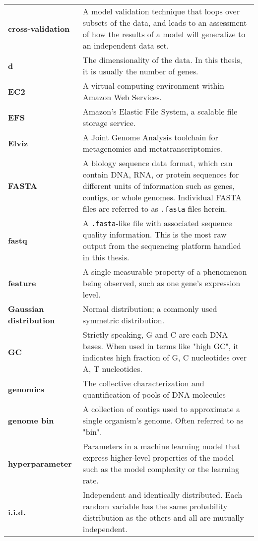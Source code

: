 \begin{singlespace}
\begin{longtable}{ p{}  p{} }
\textbf{cross-validation} &  A model validation technique that loops over subsets of the data, and leads to an assessment of how the results of a model will generalize to an independent data set.  \\
\textbf{d} & The dimensionality of the data.  In this thesis, it is usually the number of genes. \\
\textbf{EC2} & A virtual computing environment within Amazon Web Services. \\
\textbf{EFS} & Amazon's Elastic File System, a scalable file storage service.  \\
\textbf{Elviz} & A Joint Genome Analysis toolchain for metagenomics and metatranscriptomics.  \\
\textbf{FASTA} &  A biology sequence data format, which can contain DNA, RNA, or protein sequences for different units of information such as genes, contigs, or whole genomes.  Individual FASTA files are referred to as \texttt{.fasta} files herein.  \\
\textbf{fastq} & A \texttt{.fasta}-like file with associated sequence quality information.  This is the most raw output from the sequencing platform handled in this thesis. \\
\textbf{feature} & A single measurable property of a phenomenon being observed, such as one gene's expression level. \\
\textbf{Gaussian distribution} & Normal distribution; a commonly used symmetric distribution. \\
\textbf{GC} & Strictly speaking, G and C are each DNA bases.
	When used in terms like "high GC", it indicates high fraction of G, C nucleotides over A, T nucleotides. \\
\textbf{genomics} & The collective characterization and quantification of pools of DNA molecules \\
\textbf{genome bin} & A collection of contigs used to approximate a single organism's genome.  Often referred to as "bin". \\
\textbf{hyperparameter} & Parameters in a machine learning model that express higher-level properties of the model such as the model complexity or the learning rate. \\
\textbf{i.i.d.} & Independent and identically distributed.
    Each random variable has the same probability distribution as the others and all are mutually independent. \\

\end{longtable}
\end{singlespace}
